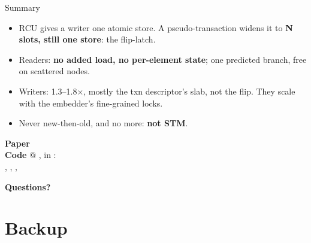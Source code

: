 \documentclass[aspectratio=169, 10pt, t, xcolor=table]{beamer}
\def\kickertext{}
\newcommand{\talksection}[1]{\section{#1}\gdef\kickertext{#1}}
\begin{document}
\begin{frame}{Summary}
\begin{itemize}
\item RCU gives a writer one atomic store. A pseudo-transaction widens it to
      \textbf{N slots, still one store}: the flip-latch.
\item Readers: \textbf{no added load, no per-element state}; one predicted
      branch, free on scattered nodes.
\item Writers: 1.3--1.8×, mostly the txn descriptor's slab, not the flip. They scale
      with the embedder's fine-grained locks.
\item Never new-then-old, and no more: \textbf{not STM}.
\end{itemize}
\vspace{1mm}
\begin{callout}
\textbf{Paper}\enspace
\href{https://www.efficios.com/pub/rcu-txn/mathieu-desnoyers-rcu-pseudo-transactions.pdf}%
     {\footnotesize{}}\\[1mm]
\textbf{Code}\enspace {} @
, in :\\
, , ,
\end{callout}
\vspace{1mm}
{\Large\bfseries Questions?\par}
\end{frame}

\appendix
\talksection{Backup}
\end{document}
